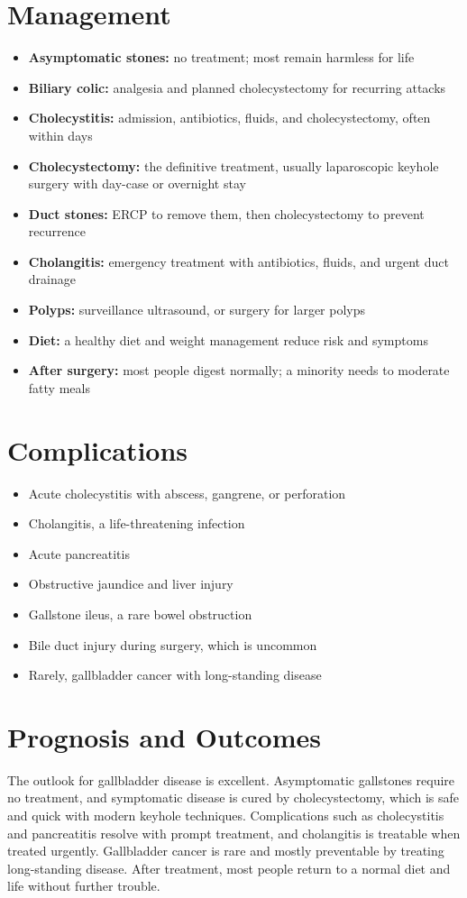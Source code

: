 \section*{Management}
\begin{itemize}
    \item \textbf{Asymptomatic stones:} no treatment; most remain harmless for life
    \item \textbf{Biliary colic:} analgesia and planned cholecystectomy for recurring attacks
    \item \textbf{Cholecystitis:} admission, antibiotics, fluids, and cholecystectomy, often within days
    \item \textbf{Cholecystectomy:} the definitive treatment, usually laparoscopic keyhole surgery with day-case or overnight stay
    \item \textbf{Duct stones:} ERCP to remove them, then cholecystectomy to prevent recurrence
    \item \textbf{Cholangitis:} emergency treatment with antibiotics, fluids, and urgent duct drainage
    \item \textbf{Polyps:} surveillance ultrasound, or surgery for larger polyps
    \item \textbf{Diet:} a healthy diet and weight management reduce risk and symptoms
    \item \textbf{After surgery:} most people digest normally; a minority needs to moderate fatty meals
\end{itemize}

\section*{Complications}
\begin{itemize}
    \item Acute cholecystitis with abscess, gangrene, or perforation
    \item Cholangitis, a life-threatening infection
    \item Acute pancreatitis
    \item Obstructive jaundice and liver injury
    \item Gallstone ileus, a rare bowel obstruction
    \item Bile duct injury during surgery, which is uncommon
    \item Rarely, gallbladder cancer with long-standing disease
\end{itemize}

\section*{Prognosis and Outcomes}
The outlook for gallbladder disease is excellent. Asymptomatic gallstones require no treatment, and symptomatic disease is cured by cholecystectomy, which is safe and quick with modern keyhole techniques. Complications such as cholecystitis and pancreatitis resolve with prompt treatment, and cholangitis is treatable when treated urgently. Gallbladder cancer is rare and mostly preventable by treating long-standing disease. After treatment, most people return to a normal diet and life without further trouble.

